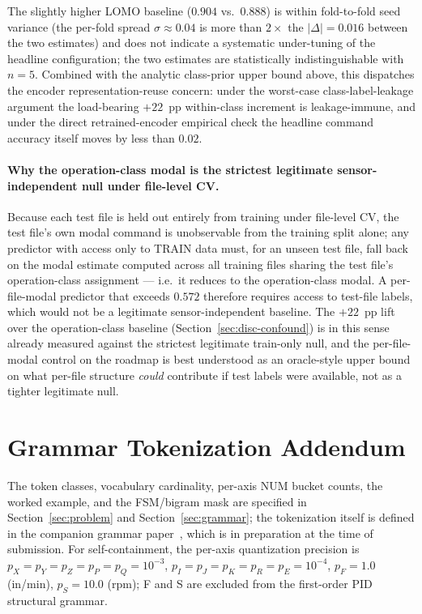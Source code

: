 \documentclass[11pt,a4paper]{article}
\begin{document}
The slightly higher LOMO baseline ($0.904$ vs.\ $0.888$) is within fold-to-fold seed variance (the per-fold spread $\sigma\!\approx\!0.04$ is more than $2\times$ the $|\Delta|\!=\!0.016$ between the two estimates) and does not indicate a systematic under-tuning of the headline configuration; the two estimates are statistically indistinguishable with $n\!=\!5$. Combined with the analytic class-prior upper bound above, this dispatches the encoder representation-reuse concern: under the worst-case class-label-leakage argument the load-bearing $+22$~pp within-class increment is leakage-immune, and under the direct retrained-encoder empirical check the headline command accuracy itself moves by less than $0.02$.

\paragraph{Why the operation-class modal is the strictest legitimate sensor-independent null under file-level CV.} Because each test file is held out entirely from training under file-level CV, the test file's own modal command is unobservable from the training split alone; any predictor with access only to TRAIN data must, for an unseen test file, fall back on the modal estimate computed across all training files sharing the test file's operation-class assignment --- i.e.\ it reduces to the operation-class modal. A per-file-modal predictor that exceeds $0.572$ therefore requires access to test-file labels, which would not be a legitimate sensor-independent baseline. The $+22$~pp lift over the operation-class baseline (Section~\ref{sec:disc-confound}) is in this sense already measured against the strictest legitimate train-only null, and the per-file-modal control on the roadmap is best understood as an oracle-style upper bound on what per-file structure \emph{could} contribute if test labels were available, not as a tighter legitimate null.

\section{Grammar Tokenization Addendum}
\label{app:grammar-spec}

The token classes, vocabulary cardinality, per-axis NUM bucket counts, the worked example, and the FSM/bigram mask are specified in Section~\ref{sec:problem} and Section~\ref{sec:grammar}; the tokenization itself is defined in the companion grammar paper~\cite{grammar_paper}, which is in preparation at the time of submission. For self-containment, the per-axis quantization precision is $p_X\!=\!p_Y\!=\!p_Z\!=\!p_P\!=\!p_Q\!=\!10^{-3}$, $p_I\!=\!p_J\!=\!p_K\!=\!p_R\!=\!p_E\!=\!10^{-4}$, $p_F\!=\!1.0$ (in/min), $p_S\!=\!10.0$ (rpm); F and S are excluded from the first-order PID structural grammar.
\end{document}

